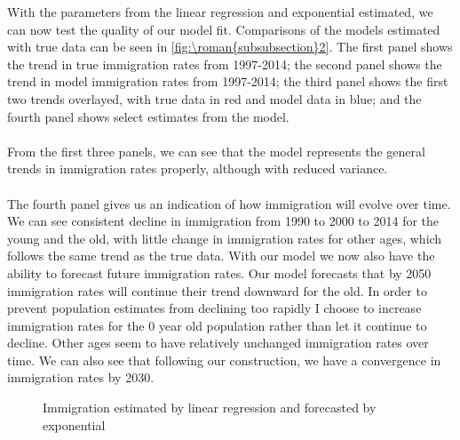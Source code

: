 \documentclass{article}
\renewcommand{\thesubsubsection}{\roman{subsubsection}}
\numberwithin{equation}{subsection}
\newcommand*{\FigureDir}{../../graphs}
\begin{document}
\begin{appendices}
\noindent
With the parameters from the linear regression and exponential estimated, we can now test the quality of our model fit. Comparisons of the models estimated with true data can be seen in \autoref{fig:\thesubsubsection2}. The first panel shows the trend in true immigration rates from 1997-2014; the second panel shows the trend in model immigration rates from 1997-2014; the third panel shows the first two trends overlayed, with true data in red and model data in blue; and the fourth panel shows select estimates from the model.
\\\\
From the first three panels, we can see that the model represents the general trends in immigration rates properly, although with reduced variance. 
\\\\
The fourth panel gives us an indication of how immigration will evolve over time. We can see consistent decline in immigration from 1990 to 2000 to 2014 for the young and the old, with little change in immigration rates for other ages, which follows the same trend as the true data. With our model we now also have the ability to forecast future immigration rates. Our model forecasts that by 2050 immigration rates will continue their trend downward for the old. In order to prevent population estimates from declining too rapidly I choose to increase immigration rates for the 0 year old population rather than let it continue to decline. Other ages seem to have relatively unchanged immigration rates over time. We can also see that following our construction, we have a convergence in immigration rates by 2030.

\begin{figure}[H]
   \centering
   \caption{\label{fig:\thesubsubsection2}Immigration estimated by linear regression and forecasted by exponential}
\end{figure}


\end{appendices}
\end{document}

